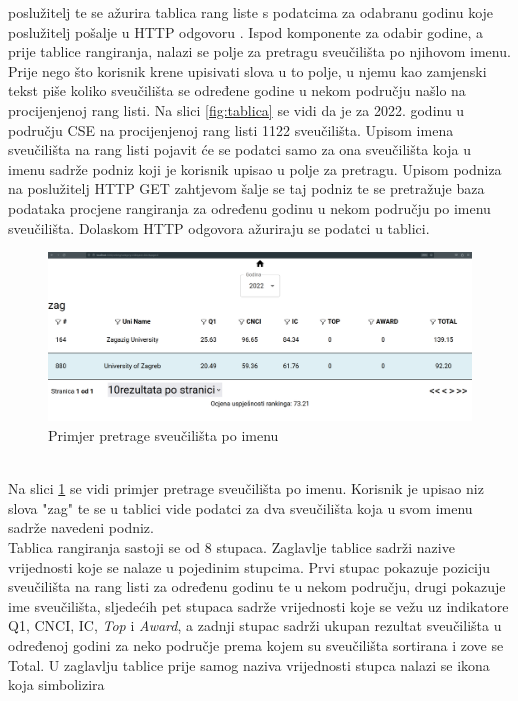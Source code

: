 \documentclass[times, utf8, zavrsni]{fer}
\begin{document}
poslužitelj te se ažurira tablica rang liste s podatcima za odabranu godinu koje poslužitelj pošalje u HTTP odgovoru .
\newpage Ispod komponente za odabir godine, a prije tablice rangiranja,
nalazi se polje za pretragu sveučilišta po njihovom imenu. Prije nego što korisnik krene upisivati slova u to polje, u njemu kao zamjenski tekst 
piše koliko sveučilišta se određene godine u nekom području našlo na procijenjenoj rang listi. Na slici \ref{fig:tablica} se vidi da je za 2022. godinu u području CSE 
na procijenjenoj rang listi 1122 sveučilišta.
Upisom imena sveučilišta na rang listi pojavit će se podatci samo za ona sveučilišta
koja u imenu sadrže podniz koji je korisnik upisao u polje za pretragu. Upisom podniza na poslužitelj HTTP GET zahtjevom šalje se taj podniz te se 
pretražuje baza podataka procjene rangiranja za određenu godinu u nekom području po imenu sveučilišta. Dolaskom HTTP odgovora ažuriraju se podatci u tablici.\\
\begin{figure}[htb]
    \hspace*{-2cm}  
       \includegraphics[scale=0.21]{search.png} 
       \caption{Primjer pretrage sveučilišta po imenu}
       \label{fig:search}
       \end{figure}
\\Na slici \ref{fig:search} se vidi primjer pretrage sveučilišta po imenu. Korisnik je upisao niz slova "zag" te se u tablici vide podatci za dva sveučilišta
koja u svom imenu sadrže navedeni podniz. 
\\Tablica rangiranja sastoji se od 8 stupaca. Zaglavlje tablice sadrži nazive vrijednosti koje se nalaze u pojedinim stupcima.
Prvi stupac pokazuje poziciju sveučilišta na rang listi za određenu godinu te u nekom području, drugi 
pokazuje ime sveučilišta, sljedećih pet stupaca sadrže vrijednosti koje se vežu uz indikatore Q1, CNCI, IC, \emph{Top} i \emph{Award}, a zadnji stupac sadrži ukupan rezultat sveučilišta 
u određenoj godini za neko područje prema kojem su sveučilišta sortirana i zove se Total. U zaglavlju tablice prije samog naziva vrijednosti stupca nalazi se ikona koja simbolizira
\end{document}
